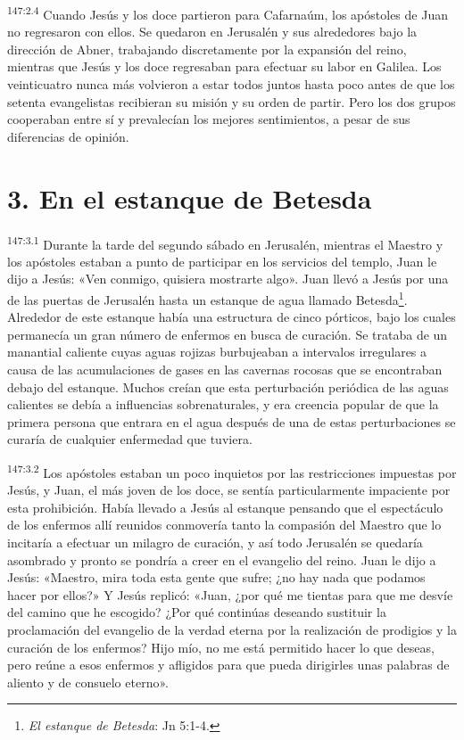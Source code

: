 \par
\textsuperscript{147:2.4} Cuando Jesús y los doce partieron para Cafarnaúm, los apóstoles de Juan no regresaron con ellos. Se quedaron en Jerusalén y sus alrededores bajo la dirección de Abner, trabajando discretamente por la expansión del reino, mientras que Jesús y los doce regresaban para efectuar su labor en Galilea. Los veinticuatro nunca más volvieron a estar todos juntos hasta poco antes de que los setenta evangelistas recibieran su misión y su orden de partir. Pero los dos grupos cooperaban entre sí y prevalecían los mejores sentimientos, a pesar de sus diferencias de opinión.

\section*{3. En el estanque de Betesda}
\par
\textsuperscript{147:3.1} Durante la tarde del segundo sábado en Jerusalén, mientras el Maestro y los apóstoles estaban a punto de participar en los servicios del templo, Juan le dijo a Jesús: «Ven conmigo, quisiera mostrarte algo». Juan llevó a Jesús por una de las puertas de Jerusalén hasta un estanque de agua llamado Betesda\footnote{\textit{El estanque de Betesda}: Jn 5:1-4.}. Alrededor de este estanque había una estructura de cinco pórticos, bajo los cuales permanecía un gran número de enfermos en busca de curación. Se trataba de un manantial caliente cuyas aguas rojizas burbujeaban a intervalos irregulares a causa de las acumulaciones de gases en las cavernas rocosas que se encontraban debajo del estanque. Muchos creían que esta perturbación periódica de las aguas calientes se debía a influencias sobrenaturales, y era creencia popular de que la primera persona que entrara en el agua después de una de estas perturbaciones se curaría de cualquier enfermedad que tuviera.

\par
\textsuperscript{147:3.2} Los apóstoles estaban un poco inquietos por las restricciones impuestas por Jesús, y Juan, el más joven de los doce, se sentía particularmente impaciente por esta prohibición. Había llevado a Jesús al estanque pensando que el espectáculo de los enfermos allí reunidos conmovería tanto la compasión del Maestro que lo incitaría a efectuar un milagro de curación, y así todo Jerusalén se quedaría asombrado y pronto se pondría a creer en el evangelio del reino. Juan le dijo a Jesús: «Maestro, mira toda esta gente que sufre; ¿no hay nada que podamos hacer por ellos?» Y Jesús replicó: «Juan, ¿por qué me tientas para que me desvíe del camino que he escogido? ¿Por qué continúas deseando sustituir la proclamación del evangelio de la verdad eterna por la realización de prodigios y la curación de los enfermos? Hijo mío, no me está permitido hacer lo que deseas, pero reúne a esos enfermos y afligidos para que pueda dirigirles unas palabras de aliento y de consuelo eterno».

